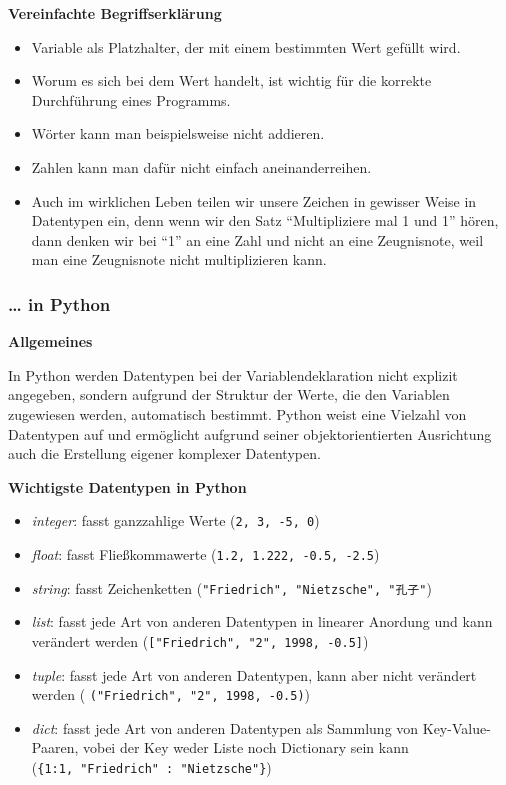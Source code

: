 \par\noindent\textbf{Vereinfachte Begriffserklärung}

\begin{itemize}
\itemsep1pt\parskip0pt
\item
  {Variable als Platzhalter, der mit einem bestimmten Wert gefüllt
  wird.}
\item
  {Worum es sich bei dem Wert handelt, ist wichtig für die korrekte
  Durchführung eines Programms.}
\item
  {Wörter kann man beispielsweise nicht addieren.}
\item
  {Zahlen kann man dafür nicht einfach aneinanderreihen.}
\item
  {Auch im wirklichen Leben teilen wir unsere Zeichen in gewisser Weise
  in Datentypen ein, denn wenn wir den Satz ``Multipliziere mal 1 und
  1'' hören, dann denken wir bei ``1'' an eine Zahl und nicht an eine
  Zeugnisnote, weil man eine Zeugnisnote nicht multiplizieren kann.}
\end{itemize}


\subsubsection{\texorpdfstring{{\ldots{} in
Python}}{\ldots{} in Python}}

\par\noindent\textbf{Allgemeines}

In Python werden Datentypen bei der Variablendeklaration nicht explizit
angegeben, sondern aufgrund der Struktur der Werte, die den Variablen
zugewiesen werden, automatisch bestimmt. Python weist eine Vielzahl von
Datentypen auf und ermöglicht aufgrund seiner objektorientierten
Ausrichtung auch die Erstellung eigener komplexer Datentypen.



\par\noindent\textbf{Wichtigste Datentypen in Python}

\begin{itemize}
\itemsep1pt\parskip0pt
\item
  {\emph{integer}: fasst ganzzahlige Werte (\texttt{2,\ 3,\ -5,\ 0})}
\item
  {\emph{float}: fasst Fließkommawerte
  (\texttt{1.2,\ 1.222,\ -0.5,\ -2.5})}
\item
  {\emph{string}: fasst Zeichenketten
  (\texttt{"Friedrich",\ "Nietzsche",\ "孔子"})}
\item
  {\emph{list}: fasst jede Art von anderen Datentypen in linearer
  Anordung und kann verändert werden
  (\texttt{{[}"Friedrich",\ "2",\ 1998,\ -0.5{]}})}
\item
  {\emph{tuple}: fasst jede Art von anderen Datentypen, kann aber nicht
  verändert werden ( \texttt{("Friedrich",\ "2",\ 1998,\ -0.5)})}
\item
  {\emph{dict}: fasst jede Art von anderen Datentypen als Sammlung von
  Key-Value-Paaren, vobei der Key weder Liste noch Dictionary sein kann
  (\texttt{\{1:1,\ "Friedrich"\ :\ "Nietzsche"\}})}
\end{itemize}



